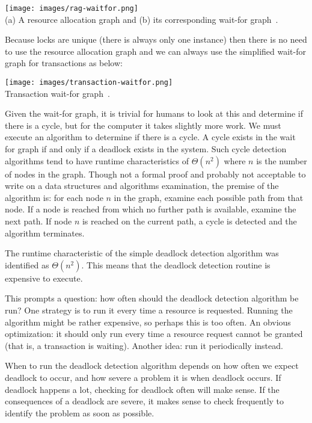 \documentclass[a4paper]{report}
\begin{document}
\begin{center}
\texttt{[image: images/rag-waitfor.png]}\\
(a) A resource allocation graph and (b) its corresponding wait-for graph~\cite{osc}.
\end{center}

Because locks are unique (there is always only one instance) then there is no need to use the resource allocation graph and we can always use the simplified wait-for graph for transactions as below:

\begin{center}
\texttt{[image: images/transaction-waitfor.png]}\\
Transaction wait-for graph~\cite{dsc}.
\end{center}


Given the wait-for graph, it is trivial for humans to look at this and determine if there is a cycle, but for the computer it takes slightly more work. We must execute an algorithm to determine if there is a cycle. A cycle exists in the wait for graph if and only if a deadlock exists in the system. Such cycle detection algorithms tend to have runtime characteristics of $\Theta(n^{2})$ where $n$ is the number of nodes in the graph. Though not a formal proof and probably not acceptable to write on a data structures and algorithms examination, the premise of the algorithm is: for each node $n$ in the graph, examine each possible path from that node. If a node is reached from which no further path is available, examine the next path. If node $n$ is reached on the current path, a cycle is detected and the algorithm terminates. 

The runtime characteristic of the simple deadlock detection algorithm was identified as $\Theta(n^{2})$. This means that the deadlock detection routine is expensive to execute.

This prompts a question: how often should the deadlock detection algorithm be run? One strategy is to run it every time a resource is requested. Running the algorithm might be rather expensive, so perhaps this is too often. An obvious optimization: it should only run every time a resource request cannot be granted (that is, a transaction is waiting). Another idea: run it periodically instead.

When to run the deadlock detection algorithm depends on how often we expect deadlock to occur, and how severe a problem it is when deadlock occurs. If deadlock happens a lot, checking for deadlock often will make sense. If the consequences of a deadlock are severe, it makes sense to check frequently to identify the problem as soon as possible.
\end{document}
